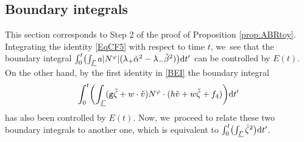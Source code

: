 \documentclass[10pt]{amsart}
\newcommand{\gr}{{\mathtt g}}
\newcommand{\ul}[1]{\underline{#1}}
\newcommand{\itGamma}{\mathit{\Gamma}}
\theoremstyle{definition}
\begin{document}
\subsection{Boundary integrals}
This section corresponds to Step 2 of the proof of Proposition \ref{prop:ABRtoy}.
Integrating the identity \eqref{EqCF5} with respect to time $t$, we~see that the boundary integral
$\int_0^t \bigl(\int_{\ul{\itGamma}} a|N^\varphi|(\lambda_+\check{\alpha}^2-\lambda_-\check{\beta}^2) \bigr){\rm d}t'$ can be controlled by $E(t)$.
On the other hand, by the first identity in \eqref{BEI} the boundary integral
\[
\int_0^t\biggl(\int_{\ul{\itGamma}}(\gr\check{\zeta}+w\cdot\check{v})N^\varphi\cdot(h\check{v}+w\check{\zeta}+f_4) \biggr){\rm d}t'
\]
has also been controlled by $E(t)$.
Now, we~proceed to relate these two boundary integrals to another one, which is equivalent to
$\int_0^t \bigl(\int_{\ul{\itGamma}}\check{\zeta}^2 \bigr){\rm d}t'$.
\end{document}
